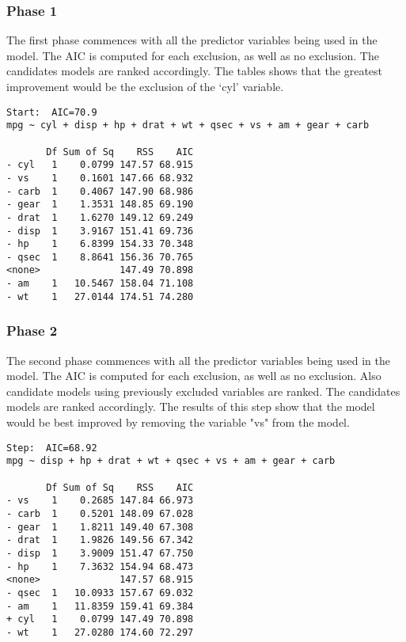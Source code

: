 \documentclass[a4paper,12pt]{article}
\begin{document}
\subsubsection{Phase 1}
The first phase commences with all the predictor variables being used in the model. The AIC is computed for each exclusion, as well as no exclusion. The candidates models are ranked accordingly. The tables shows that the greatest improvement would be the exclusion of the `cyl' variable.
\footnotesize
\begin{verbatim}
Start:  AIC=70.9
mpg ~ cyl + disp + hp + drat + wt + qsec + vs + am + gear + carb

       Df Sum of Sq    RSS    AIC
- cyl   1    0.0799 147.57 68.915
- vs    1    0.1601 147.66 68.932
- carb  1    0.4067 147.90 68.986
- gear  1    1.3531 148.85 69.190
- drat  1    1.6270 149.12 69.249
- disp  1    3.9167 151.41 69.736
- hp    1    6.8399 154.33 70.348
- qsec  1    8.8641 156.36 70.765
<none>              147.49 70.898
- am    1   10.5467 158.04 71.108
- wt    1   27.0144 174.51 74.280
\end{verbatim}
\normalsize
\subsubsection{Phase 2}
The second phase commences with all the predictor variables being used in the model. The AIC is computed for each exclusion, as well as no exclusion. Also candidate models using previously excluded variables are ranked. The candidates models are ranked accordingly.
The results of this step show that the model would be best improved by removing the variable "vs" from the model.
\footnotesize
\begin{verbatim}
Step:  AIC=68.92
mpg ~ disp + hp + drat + wt + qsec + vs + am + gear + carb

       Df Sum of Sq    RSS    AIC
- vs    1    0.2685 147.84 66.973
- carb  1    0.5201 148.09 67.028
- gear  1    1.8211 149.40 67.308
- drat  1    1.9826 149.56 67.342
- disp  1    3.9009 151.47 67.750
- hp    1    7.3632 154.94 68.473
<none>              147.57 68.915
- qsec  1   10.0933 157.67 69.032
- am    1   11.8359 159.41 69.384
+ cyl   1    0.0799 147.49 70.898
- wt    1   27.0280 174.60 72.297
\end{verbatim}
\normalsize
\newpage
\end{document}
